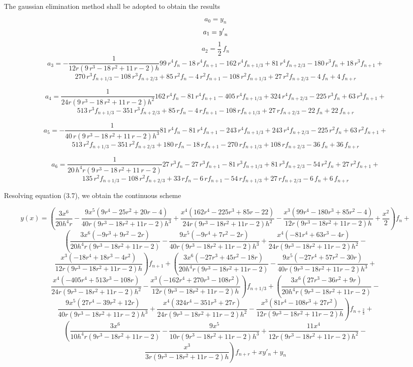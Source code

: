 \documentclass[12pt]{report}
\begin{document}
\noindent The gaussian elimination method shall be adopted to obtain the results

$$a_{{0}}=y_{{n}}$$
$$a_{{1}}={\it y'}_{{n}}$$
$$a_{{2}}=\frac{1}{2}\,f_{{n}}$$
$$a_{{3}}=-\frac{1}{12r \left( 9\,{r}^{3}-18\,{r}^{2}+11\,r-2\right) h}99\,{r}^{4}f_{{n}}-18\,{r}^{4}f_{{n+1}}-162\,{r}^{4}f_{{n+1/3}}+81\,{r}^{4}f_{{n+2/3}}-180\,{r}^{3}f_{{n}}+18\,{r}^{3}f_{{n+1}}+$$ $$270\,{r}^{3}f_{{n+1/3}}-108\,{r}^{3}f_{{n+2/3}}+85\,{r}^{2}f_{{n}}-4\,{r}^{2}f_{{n+1}}-108\,{r}^{2}f_{{n+1/3}}+27\,{r}^{2}f_{{n+2/3}}-4\,f_{{n}}+4\,f_{{n+r}}$$

$$a_{{4}}=\frac{1}{24{r\left(9\,{r}^{3}-18\,{r}^{2}+11\,r-2 \right) {h}^{2}}}162\,{r}^{4}f_{{n}}-81\,{r}^{4}f_{{n+1}}-405\,{r}^{4}f_{{n+1/3}}+324\,{r}^{4}f_{{n+2/3}}-225\,{r}^{3}f_{{n}}+63\,{r}^{3}f_{{n+1}}+$$ $$513\,{r}^{3}f_{{n+1/3}}-351\,{r}^{3}f_{{n+2/3}}+85\,rf_{{n}}-4\,rf_{{n+1}}-108\,rf_{{n+1/3}}+27\,rf_{{n+2/3}}-22\,f_{{n}}+22\,f_{n+r}$$

$$a_{{5}}=-\frac{1}{{40\,r \left( 9\,{r}^{3}-18\,{r}^{2}+11\,r-2 \right) {h}^{3}}}81\,{r}^{4}f_{{n}}-81\,{r}^{4}f_{{n+1}}-243\,{r}^{4}f_{{n+1/3}}+243\,{r}^{4}f_{{n+2/3}}-225\,{r}^{2}f_{{n}}+63\,{r}^{2}f_{{n+1}}+$$
$$513\,{r}^{2}f_{{n+1/3}}-351\,{r}^{2}f_{{n+2/3}}+180\,rf_{{n}}-18\,rf_{{n+1}}-270\,rf_{{n+1/3}}+108\,rf_{{n+2/3}}-36\,f_{{n}}+36\,f_{{n+r}}$$
	
$$a_{{6}}=\frac{1}{20\,{h}^{4}r \left( 9\,{r}^{3}-18\,{r}^{2}+11\,r-2 \right)}27\,{r}^{3}f_{{n}}-27\,{r}^{3}f_{{n+1}}-81\,{r}^{3}f_{{n+1/3}}+81\,{r}^{3}f_{{n+2/3}}-54\,{r}^{2}f_{{n}}+27\,{r}^{2}f_{{n+1}}+$$ $$135\,{r}^{2}f_{{n+1/3}}-108\,{r}^{2}f_{{n+2/3}}+33\,rf_{{n}}-6\,rf_{{n+1}}-54\,rf_{{n+1/3}}+27\,rf_{{n+2/3}}-6\,f_{{n}}+6\,f_{{n+r}}$$

\noindent Resolving equation (3.7), we obtain the continuous scheme

$$y(x)=\left(\frac{3x^6}{20 h^4r}-\frac{9x^5(9r^4 - 25r^2 + 20r - 4)}{40r(9r^3 - 18r^2 + 11r - 2)h^3}+\frac{x^4(162r^4 - 225r^3 + 85r - 22)}{24r(9r^3 - 18r^2 + 11r - 2)h^2}-\frac{x^3(99r^4 - 180r^3 + 85r^2 - 4)}{12r(9r^3 - 18r^2 + 11r - 2)h}+\frac{x^2}{2}\right)f_n+$$
$$\left(\frac{3x^6(-9r^3 + 9r^2 - 2r)}{20h^4r(9r^3 - 18r^2 + 11r - 2)}-\frac{9x^5(-9r^4 + 7r^2 - 2r)}{40r(9r^3 - 18r^2 + 11r - 2)h^3}+\frac{x^4(-81r^4 + 63r^3 - 4r)}{24r(9r^3 - 18r^2 + 11r - 2)h^2}-\right.$$ $$\left.\frac{x^3(-18r^4 + 18r^3 - 4r^2)}{12r(9r^3 - 18r^2 + 11r - 2)h}\right)f_{n + 1}+\left(\frac{3x^6(-27r^3 + 45r^2 - 18r)}{20h^4r(9r^3 - 18r^2 + 11r - 2)}-\frac{9x^5(-27r^4 + 57r^2 - 30r)}{40r(9r^3 - 18r^2 + 11r - 2)h^3}+\right.$$ $$\left.\frac{x^4(-405r^4 + 513r^3 - 108r)}{24r(9r^3 - 18r^2 + 11r - 2)h^2}-\frac{x^3(-162r^4 + 270r^3 - 108r^2)}{12r(9r^3 - 18r^2 + 11r - 2)h}\right)f_{n + 1/3}+\left(\frac{3x^6(27r^3 - 36r^2 + 9r)}{20h^4r(9r^3 - 18r^2 + 11r - 2)}-\right.$$ $$\left.\frac{9x^5(27r^4 - 39r^2 + 12r)}{40r(9r^3 - 18r^2 + 11r - 2)h^3}+\frac{x^4(324r^4 - 351r^3 + 27r)}{24r(9r^3 - 18r^2 + 11r - 2)h^2}-\frac{x^3(81r^4 - 108r^3 + 27r^2)}{12r(9r^3 - 18r^2 + 11r - 2)h}\right)f_{n+\frac{2}{3}}+$$
$$\left(\frac{3x^6}{10h^4r(9r^3 - 18r^2 + 11r - 2)}-\frac{9x^5}{10r(9r^3 - 18r^2 + 11r - 2)h^3}+\frac{11x^4}{12r(9r^3 - 18r^2 + 11r - 2)h^2}-\right.$$ $$\left.\frac{x^3}{3r(9r^3 - 18r^2 + 11r - 2)h}\right)f_{n+r}+xy'_n+y_n$$
\end{document}
